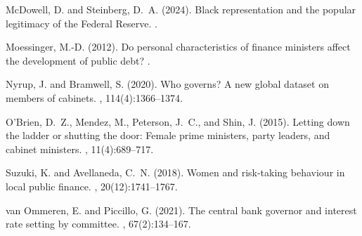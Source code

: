 \documentclass[12pt]{article}
\begin{document}
\begin{thebibliography}{}
McDowell, D. and Steinberg, D.~A. (2024).
\newblock Black representation and the popular legitimacy of the {Federal
  Reserve}.
.
 
Moessinger, M.-D. (2012).
\newblock Do personal characteristics of finance ministers affect the
  development of public debt?
.
 
Nyrup, J. and Bramwell, S. (2020).
\newblock Who governs? {A} new global dataset on members of cabinets.
, 114(4):1366--1374.
 
O'Brien, D.~Z., Mendez, M., Peterson, J.~C., and Shin, J. (2015).
\newblock Letting down the ladder or shutting the door: Female prime ministers,
  party leaders, and cabinet ministers.
, 11(4):689--717.
 
Suzuki, K. and Avellaneda, C.~N. (2018).
\newblock Women and risk-taking behaviour in local public finance.
, 20(12):1741--1767.
 
van Ommeren, E. and Piccillo, G. (2021).
\newblock The central bank governor and interest rate setting by committee.
, 67(2):134--167.
 
\end{thebibliography}
 
\end{document}
